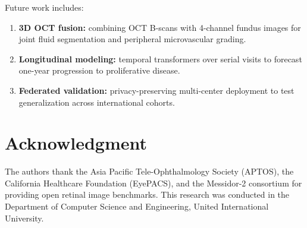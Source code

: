 \documentclass[conference]{IEEEtran}
\begin{document}
Future work includes:
\begin{enumerate}
\item \textbf{3D OCT fusion:} combining OCT B-scans with 4-channel fundus images for joint fluid segmentation and peripheral microvascular grading.
\item \textbf{Longitudinal modeling:} temporal transformers over serial visits to forecast one-year progression to proliferative disease.
\item \textbf{Federated validation:} privacy-preserving multi-center deployment to test generalization across international cohorts.
\end{enumerate}

\section*{Acknowledgment}
The authors thank the Asia Pacific Tele-Ophthalmology Society (APTOS), the California Healthcare Foundation (EyePACS), and the Messidor-2 consortium for providing open retinal image benchmarks. This research was conducted in the Department of Computer Science and Engineering, United International University.
\end{document}
